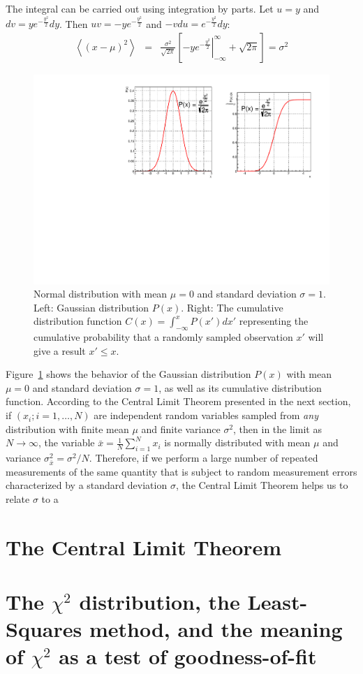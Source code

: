 \documentclass{revtex4}
\begin{document}
The integral can be carried out using integration by parts. Let $u =
y$ and $dv = ye^{-\frac{y^2}{2}} dy$. Then $uv = -ye^{-\frac{y^2}{2}}$
and $-v du =e^{-\frac{y^2}{2}} dy$:
\begin{eqnarray}
  \left<(x-\mu)^2\right> &=& \frac{\sigma^2}{\sqrt{2\pi}}
  \left[\left.-ye^{-\frac{y^2}{2}}\right|_{-\infty}^{\infty} +
    \sqrt{2\pi} \right] = \sigma^2
\end{eqnarray}
\begin{figure}[h]
  \begin{center}
    \includegraphics[width=.98\textwidth]{Gaussian.pdf}
  \end{center}
  \caption{\label{fig:Gauss} Normal distribution with mean $\mu = 0$ and
    standard deviation $\sigma = 1$. Left: Gaussian distribution $P(x)$. Right: The
    cumulative distribution function $C(x) = \int_{-\infty}^x P(x') dx'$
    representing the cumulative probability that a randomly sampled
    observation $x'$ will give a result $x' \le x$.}
\end{figure}
Figure~\ref{fig:Gauss} shows the behavior of the Gaussian distribution
$P(x)$ with mean $\mu = 0$ and standard deviation $\sigma = 1$, as
well as its cumulative distribution function. According to the Central Limit
Theorem presented in the next section, if $(x_i; i=1,\ldots,N)$ are
independent random variables sampled from \emph{any} distribution with finite mean $\mu$ and finite
variance $\sigma^2$, then in the limit as $N \rightarrow \infty$, the
variable $\bar{x} = \frac{1}{N} \sum_{i=1}^N x_i$ is normally
distributed with mean $\mu$ and variance $\sigma_{\bar{x}}^2 =
\sigma^2/N$. Therefore, if we perform a large number of repeated
measurements of the same quantity that is subject to random
measurement errors characterized by a standard deviation $\sigma$, the
Central Limit Theorem helps us to relate $\sigma$ to a 

\section{The Central Limit Theorem}
\section{The $\chi^2$ distribution, the Least-Squares method, and the
  meaning of $\chi^2$ as a test of goodness-of-fit}
\end{document}
